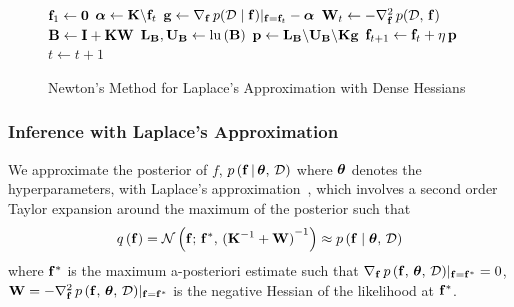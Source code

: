 \begin{figure}[t]
  \removelatexerror
  \begin{algorithm2e}[H]
    \DontPrintSemicolon
    \SetAlgoLined
    \( \mathbf{f}_1 \leftarrow \mathbf{0} \)\;
     {
      \(\bm{\alpha}        \leftarrow \mathbf{K}\backslash\mathbf{f}_{t} \)\;
      \(\mathbf{g}            \leftarrow \nabla_{\mathbf{f}}\, p(\mathcal{D}\mid\mathbf{f})|_{\mathbf{f} = \mathbf{f}_t} - \bm{\alpha} \)\;
      \(\mathbf{W}_t          \leftarrow -  \nabla^2_{\mathbf{f}}\, p(\mathcal{D},\, \mathbf{f}) \)\;
      \(\mathbf{B}           \leftarrow \mathbf{I} + \mathbf{K} \mathbf{W} \)\;
      \(\mathbf{L}_{\mathbf{B}}, \mathbf{U}_{\mathbf{B}} \leftarrow \mathrm{lu}\,(\mathbf{B}) \)\;
      \(\mathbf{p}           \leftarrow \mathbf{L}_{\mathbf{B}} \backslash \mathbf{U}_{\mathbf{B}} \backslash \mathbf{K} \mathbf{g} \)\;
      \(\mathbf{f}_{t+1}      \leftarrow \mathbf{f}_t + \eta \, \mathbf{p} \)\;
      \(t \leftarrow t + 1\)\;
    }
    \caption{Newton's Method for Laplace's Approximation with Dense Hessians}\label{alg:newton}
  \end{algorithm2e}
\end{figure}
%
\subsubsection{Inference with Laplace's Approximation}
We approximate the posterior of \(f\), \(p\,(\mathbf{f}\,|\,\bm{\theta},\, \mathcal{D})\) where \(\bm{\theta}\) denotes the hyperparameters, with Laplace's approximation~\cite{williams_bayesian_1998}, which involves a second order Taylor expansion around the maximum of the posterior such that
\begin{align}
q\,(\mathbf{f}) = \mathcal{N}\left(\mathbf{f};\, \mathbf{f}^*,\, {(\mathbf{K}^{-1} + \mathbf{W})}^{-1}\right) \approx p\,(\mathbf{f} \mid \bm{\theta},\, \mathcal{D})
\end{align}
where \(\mathbf{f}^*\) is the maximum a-posteriori estimate such that \(\nabla_{\mathbf{f}}\, p\,(\mathbf{f}, \, \bm{\theta},\, \mathcal{D})|_{\mathbf{f} = \mathbf{f}^*} = 0\), \(\mathbf{W} = -\nabla^2_{\mathbf{f}}\, p\,(\mathbf{f},\,\bm{\theta},\, \mathcal{D})|_{\mathbf{f}=\mathbf{f}^*} \) is the negative Hessian of the likelihood at \(\mathbf{f}^*\).

